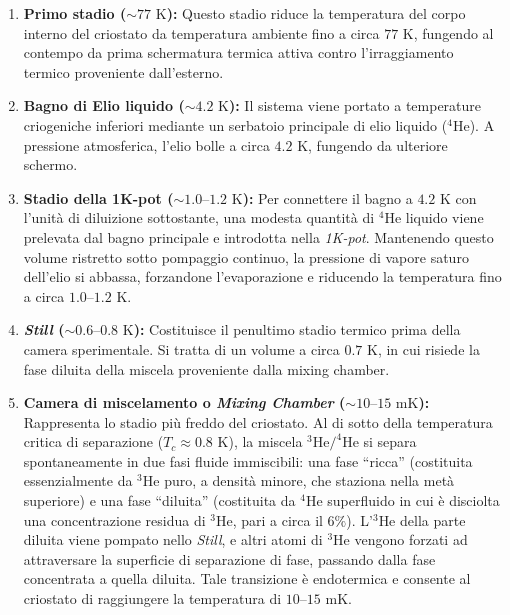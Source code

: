 \begin{enumerate}
    \item \textbf{Primo stadio ($\sim 77\text{ K}$):} Questo stadio riduce la temperatura del corpo interno del criostato da temperatura ambiente fino a circa $77\text{ K}$, fungendo al contempo da prima schermatura termica attiva contro l'irraggiamento termico proveniente dall'esterno.
    
    \item \textbf{Bagno di Elio liquido ($\sim 4.2\text{ K}$):} Il sistema viene portato a temperature criogeniche inferiori mediante un serbatoio principale di elio liquido ($^4\text{He}$). A pressione atmosferica, l'elio bolle a circa $4.2\text{ K}$, fungendo da ulteriore schermo.

    \item \textbf{Stadio della 1K-pot ($\sim 1.0\text{--}1.2\text{ K}$):} Per connettere il bagno a $4.2\text{ K}$ con l'unità di diluizione sottostante, una modesta quantità di $^4\text{He}$ liquido viene prelevata dal bagno principale e introdotta nella \textit{1K-pot}. Mantenendo questo volume ristretto sotto pompaggio continuo, la pressione di vapore saturo dell'elio si abbassa, forzandone l'evaporazione e riducendo la temperatura fino a circa $1.0\text{--}1.2\text{ K}$.

    \item \textbf{\textit{Still} ($\sim 0.6\text{--}0.8\text{ K}$):} Costituisce il penultimo stadio termico prima della camera sperimentale. Si tratta di un volume a circa $0.7\text{ K}$, in cui risiede la fase diluita della miscela proveniente dalla mixing chamber.

    \item \textbf{Camera di miscelamento o \textit{Mixing Chamber} ($\sim 10\text{--}15\text{ mK}$):} Rappresenta lo stadio più freddo del criostato. Al di sotto della temperatura critica di separazione ($T_c \approx 0.8\text{ K}$), la miscela $^3\text{He}/^4\text{He}$ si separa spontaneamente in due fasi fluide immiscibili: una fase ``ricca'' (costituita essenzialmente da $^3\text{He}$ puro, a densità minore, che staziona nella metà superiore) e una fase ``diluita'' (costituita da $^4\text{He}$ superfluido in cui è disciolta una concentrazione residua di $^3\text{He}$, pari a circa il $6\%$). L'$^3\text{He}$ della parte diluita viene pompato nello \textit{Still}, e altri atomi di $^3\text{He}$ vengono forzati ad attraversare la superficie di separazione di fase, passando dalla fase concentrata a quella diluita. Tale transizione è endotermica e consente al criostato di raggiungere la temperatura di $10\text{--}15\text{ mK}$.
\end{enumerate}

